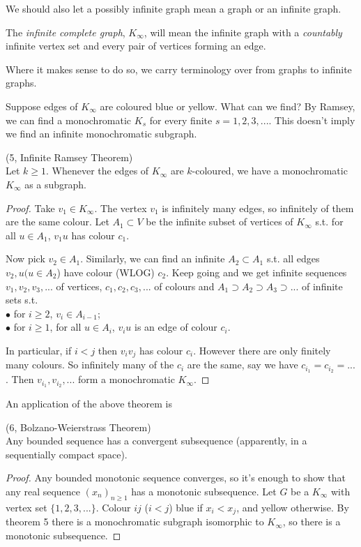 \documentclass[a4paper]{article}
\begin{document}
We should also let a possibly infinite graph mean a graph or an infinite graph.

The \emph{infinite complete graph}, $K_\infty$, will mean the infinite graph with a \emph{countably} infinite vertex set and every pair of vertices forming an edge.

Where it makes sense to do so, we carry terminology over from graphs to infinite graphs.

Suppose edges of $K_\infty$ are coloured blue or yellow. What can we find? By Ramsey, we can find a monochromatic $K_s$ for every finite $s=1,2,3,...$. This doesn't imply we find an infinite monochromatic subgraph.

\begin{thm} (5, Infinite Ramsey Theorem)\\
Let $k \geq 1$. Whenever the edges of $K_\infty$ are $k$-coloured, we have a monochromatic $K_\infty$ as a subgraph.
\begin{proof}
Take $v_1 \in K_\infty$. The vertex $v_1$ is infinitely many edges, so infinitely of them are the same colour. Let $A_1 \subset V$ be the infinite subset of vertices of $K_\infty$ s.t. for all $u \in A_1$, $v_1 u$ has colour $c_1$.

Now pick $v_2 \in A_1$. Similarly, we can find an infinite $A_2 \subset A_1$ s.t. all edges $v_2,u(u \in A_2$) have colour (WLOG) $c_2$. Keep going and we get infinite sequences $v_1,v_2,v_3,...$ of vertices, $c_1,c_2,c_3,...$ of colours and $A_1 \supset A_2 \supset A_3 \supset ...$ of infinite sets s.t.\\
$\bullet$ for $i \geq 2$, $v_i \in A_{i-1}$;\\
$\bullet$ for $i \geq 1$, for all $u \in A_i$, $v_i u$ is an edge of colour $c_i$.

In particular, if $i<j$ then $v_i v_j$ has colour $c_i$. However there are only finitely many colours. So infinitely many of the $c_i$ are the same, say we have $c_{i_1} = c_{i_2} = ... $. Then $v_{i_1},v_{i_2},...$ form a monochromatic $K_\infty$.
\end{proof}
\end{thm}

An application of the above theorem is

\begin{coro} (6, Bolzano-Weierstrass Theorem)\\
Any bounded sequence has a convergent subsequence (apparently, in a sequentially compact space).
\begin{proof}
Any bounded monotonic sequence converges, so it's enough to show that any real sequence $(x_n)_{n \geq 1}$ has a monotonic subsequence. Let $G$ be a $K_\infty$ with vertex set $\{1,2,3,...\}$. Colour $ij$ ($i<j$) blue if $x_i<x_j$, and yellow otherwise. By theorem 5 there is a monochromatic subgraph isomorphic to $K_\infty$, so there is a monotonic subsequence.
\end{proof}
\end{coro}
\end{document}
